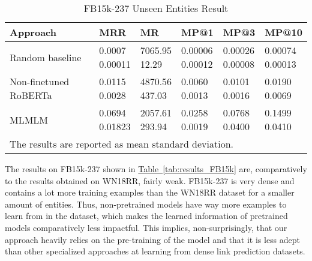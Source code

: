 \documentclass[11pt,a4paper]{article}
\newcommand{\RefTable}[1]{\hyperref[#1]{Table~\ref{#1}}}
\newcommand{\TableW}[3]{\begin{table*}[h!]
\begin{center}
  \caption{#3} 
  \vspace{-0.25\baselineskip}
  \label{#2}
  #1
\end{center}
\end{table*}}
\begin{document}
\TableW{\begin{tabular}{m{}m{}m{0.1\textwidth}m{0.1\textwidth}m{0.1\textwidth}m{0.1\textwidth}}
    \toprule
    Approach & MRR  & MR  & MP@1  & MP@3  & MP@10 \\
    \midrule 
    Random baseline & 
        \shortstack[l]{{0.0007}\\{\small 0.00011}} &
        \shortstack[l]{{7065.95}\\{\small 12.29}} &
        \shortstack[l]{{0.00006}\\{\small 0.00012}} &
        \shortstack[l]{{0.00026}\\{\small 0.00008}} &
        \shortstack[l]{{0.00074}\\{\small 0.00013}}\\
    Non-finetuned RoBERTa & 
        \shortstack[l]{{0.0115}\\{\small 0.0028}} &
        \shortstack[l]{{4870.56}\\{\small 437.03}} &
        \shortstack[l]{{0.0060}\\{\small 0.0013}} &
        \shortstack[l]{{0.0101}\\{\small 0.0016}} &
        \shortstack[l]{{0.0190}\\{\small 0.0069}}\\
    MLMLM & 
        \shortstack[l]{{0.0694}\\{\small 0.01823}} &
        \shortstack[l]{{2057.61}\\{\small 293.94}} &
        \shortstack[l]{{0.0258}\\{\small 0.0019}} &
        \shortstack[l]{{0.0768}\\{\small 0.0400}} &
        \shortstack[l]{{0.1499}\\{\small 0.0410}}\\
    \bottomrule
    \multicolumn{6}{p{.8\textwidth}}{\small The results are reported as mean  standard deviation.}
  \end{tabular}}
{tab:results4}
{FB15k-237 Unseen Entities Result}

The results on FB15k-237 shown in \RefTable{tab:results_FB15k} are, comparatively to the results obtained on WN18RR, fairly weak.
FB15k-237 is very dense and contains a lot more training examples than the WN18RR dataset for a smaller amount of entities.
Thus, non-pretrained models have way more examples to learn from in the dataset, which makes the learned information of pretrained models comparatively less impactful.
This implies, non-surprisingly, that our approach heavily relies on the pre-training of the model and that it is less adept than other specialized approaches at learning from dense link prediction datasets.
\end{document}
